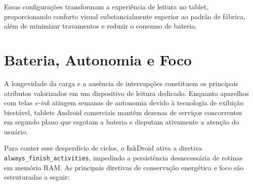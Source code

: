 \documentclass[
    12pt,
    openright,
    oneside,
    a4paper,
    english,
    brazilian
    ]{abntex2}
\begin{document}
Essas configurações transformam a experiência de leitura no tablet, proporcionando conforto visual substancialmente superior ao padrão de fábrica, além de minimizar travamentos e reduzir o consumo de bateria.

\section{Bateria, Autonomia e Foco}

A longevidade da carga e a ausência de interrupções constituem os principais atributos valorizados em um dispositivo de leitura dedicado. Enquanto aparelhos com telas \textit{e-ink} atingem semanas de autonomia devido à tecnologia de exibição biestável, tablets Android comerciais mantêm dezenas de serviços concorrentes em segundo plano que esgotam a bateria e disputam ativamente a atenção do usuário.

Para conter esse desperdício de ciclos, o InkDroid ativa a diretiva \texttt{always\_finish\_activities}, impedindo a persistência desnecessária de rotinas em memória RAM. As principais diretivas de conservação energética e foco são estruturadas a seguir:
\end{document}
